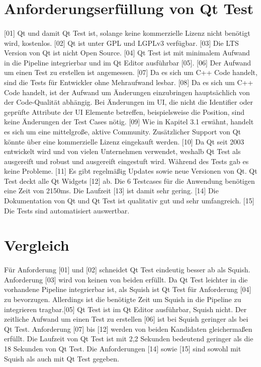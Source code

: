 	\section{Anforderungserfüllung von Qt Test}
	\paragraph{} [01] Qt und damit Qt Test ist, solange keine kommerzielle Lizenz nicht benötigt wird, kostenlos. [02] Qt ist unter GPL und LGPLv3 verfügbar. [03] Die LTS Version von Qt ist nicht Open Source. [04] Qt Test ist mit minimalem Aufwand in die Pipeline integrierbar und im Qt Editor ausführbar [05]. [06] Der Aufwand um einen Test zu erstellen ist angemessen. [07] Da es sich um C++ Code handelt, sind die Tests für Entwickler ohne Mehraufwand lesbar. [08] Da es sich um C++ Code handelt, ist der Aufwand um Änderungen einzubringen hauptsächlich von der Code-Qualität abhängig. Bei Änderungen im UI, die nicht die Identifier oder geprüfte Attribute der UI Elemente betreffen, beispielsweise die Position, sind keine Änderungen der Test Cases nötig. [09] Wie in Kapitel 3.1 erwähnt, handelt es sich um eine mittelgroße, aktive Community. Zusätzlicher Support von Qt könnte über eine kommerzielle Lizenz eingekauft werden. [10] Da Qt seit 2003 entwickelt wird und von vielen Unternehmen verwendet, weshalb Qt Test als ausgereift und robust und ausgereift eingestuft wird. Während des Tests gab es keine Probleme. [11] Es gibt regelmäßig Updates sowie neue Versionen von Qt. Qt Test deckt alle Qt Widgets [12] ab. Die 6 Testcases für die Anwendung benötigen eine Zeit von 2150ms. Die Laufzeit [13] ist damit sehr gering. [14] Die Dokumentation von Qt und Qt Test ist qualitativ gut und sehr umfangreich. [15] Die Tests sind automatisiert auswertbar.
	\section{Vergleich}
	\paragraph{}Für Anforderung [01] und [02] schneidet Qt Test eindeutig besser ab als Squish. Anforderung [03] wird von keinen von beiden erfüllt. Da Qt Test leichter in die vorhandene Pipeline integrierbar ist, als Squish ist Qt Test für Anforderung [04] zu bevorzugen. Allerdings ist die benötigte Zeit um Squish in die Pipeline zu integrieren tragbar.[05] Qt Test ist im Qt Editor ausführbar, Squish nicht. Der zeitliche Aufwand um einen Test zu erstellen [06] ist bei Squish geringer als bei Qt Test. Anforderung [07] bis [12] werden von beiden Kandidaten gleichermaßen erfüllt. Die Laufzeit von Qt Test ist mit 2,2 Sekunden bedeutend geringer als die 18 Sekunden von Qt Test. Die Anforderungen [14] sowie [15] sind sowohl mit Squish als auch mit Qt Test gegeben.
